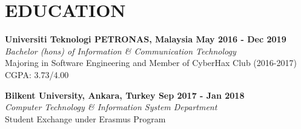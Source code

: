 \vspace{0.3cm}
\section{EDUCATION}

\textbf{Universiti Teknologi PETRONAS, Malaysia
\hfill{May 2016 - Dec 2019}} \vspace{0.1cm} \\
{\sl Bachelor (hons) of Information \& Communication Technology} \vspace{0.1cm} \\
\hfill Majoring in Software Engineering and Member of CyberHax Club (2016-2017) \vspace{0.15cm} \\
\hfill{CGPA: 3.73/4.00}

\textbf{Bilkent University, Ankara, Turkey
\hfill{Sep 2017 - Jan 2018}} \vspace{0.1cm} \\
{\sl Computer Technology \& Information System Department} \vspace{0.1cm} \\
\hfill Student Exchange under Erasmus Program \\

